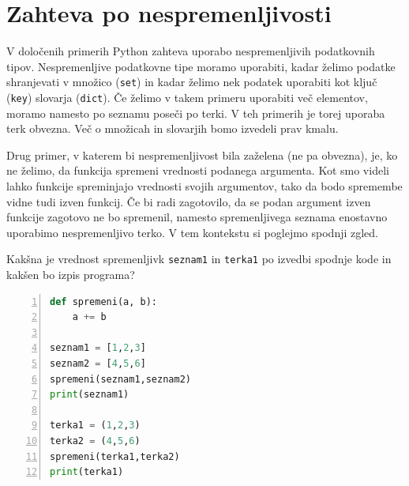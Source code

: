 \section{Zahteva po nespremenljivosti}
V določenih primerih Python zahteva uporabo nespremenljivih podatkovnih tipov. Nespremenljive podatkovne tipe moramo uporabiti, kadar želimo podatke shranjevati v množico (\texttt{set}) in kadar želimo nek podatek uporabiti kot ključ (\texttt{key}) slovarja (\texttt{dict}). Če želimo v takem primeru uporabiti več elementov, moramo namesto po seznamu poseči po terki. V teh primerih je torej uporaba terk obvezna. Več o množicah in slovarjih bomo izvedeli prav kmalu.

Drug primer, v katerem bi nespremenljivost bila zaželena (ne pa obvezna), je, ko ne želimo, da funkcija spremeni vrednosti podanega argumenta. Kot smo videli lahko funkcije spreminjajo vrednosti svojih argumentov, tako da bodo spremembe vidne tudi izven funkcij. Če bi radi zagotovilo, da se podan argument izven funkcije zagotovo ne bo spremenil, namesto spremenljivega seznama enostavno uporabimo nespremenljivo terko. V tem kontekstu si poglejmo spodnji zgled.

\begin{zgled}
Kakšna je vrednost spremenljivk \texttt{seznam1} in \texttt{terka1}  po izvedbi spodnje kode in kakšen bo izpis programa?
\begin{lstlisting}[language=Python,numbers=left]
def spremeni(a, b):
    a += b

seznam1 = [1,2,3]
seznam2 = [4,5,6]
spremeni(seznam1,seznam2)
print(seznam1)

terka1 = (1,2,3)
terka2 = (4,5,6)
spremeni(terka1,terka2)
print(terka1)
\end{lstlisting}
\end{zgled}


